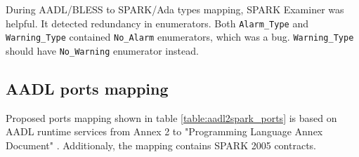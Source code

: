 During AADL/BLESS to SPARK/Ada types mapping, SPARK Examiner was helpful. It detected redundancy in enumerators. Both \lstinline{Alarm_Type} and \lstinline{Warning_Type} contained \lstinline{No_Alarm} enumerators, which was a bug. \lstinline{Warning_Type} should have \lstinline{No_Warning} enumerator instead.

\subsection{AADL ports mapping}
\label{codegen:mapping:ports}

Proposed ports mapping shown in table \ref{table:aadl2spark_ports} is based on AADL runtime services from Annex 2 to "Programming Language Annex Document" \cite{AnnexDoc13}. Additionaly, the mapping contains SPARK 2005 contracts.

